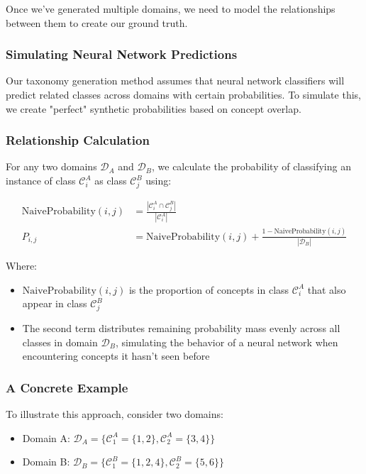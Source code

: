 Once we've generated multiple domains, we need to model the relationships between them to create our ground truth.

\subsubsection{Simulating Neural Network Predictions}

Our taxonomy generation method assumes that neural network classifiers will predict related classes across domains with certain probabilities. To simulate this, we create "perfect" synthetic probabilities based on concept overlap.

\subsubsection{Relationship Calculation}

For any two domains $\mathcal{D}_A$ and $\mathcal{D}_B$, we calculate the probability of classifying an instance of class $\mathcal{C}_i^A$ as class $\mathcal{C}_j^B$ using:

\begin{equation}
    \begin{aligned}
        \text{NaiveProbability}(i, j) & = \frac{|\mathcal{C}_i^A \cap \mathcal{C}_j^B|}{|\mathcal{C}_i^A|}                          \\
        P_{i,j}                       & = \text{NaiveProbability}(i, j) + \frac{1 - \text{NaiveProbability}(i, j)}{|\mathcal{D}_B|}
    \end{aligned}
\end{equation}

Where:
\begin{itemize}
    \item $\text{NaiveProbability}(i, j)$ is the proportion of concepts in class $\mathcal{C}_i^A$ that also appear in class $\mathcal{C}_j^B$
    \item The second term distributes remaining probability mass evenly across all classes in domain $\mathcal{D}_B$, simulating the behavior of a neural network when encountering concepts it hasn't seen before
\end{itemize}

\subsubsection{A Concrete Example}

To illustrate this approach, consider two domains:
\begin{itemize}
    \item Domain A: $\mathcal{D}_A = \{\mathcal{C}_1^A=\{1,2\}, \mathcal{C}_2^A=\{3,4\}\}$
    \item Domain B: $\mathcal{D}_B = \{\mathcal{C}_1^B=\{1,2,4\}, \mathcal{C}_2^B=\{5,6\}\}$
\end{itemize}

